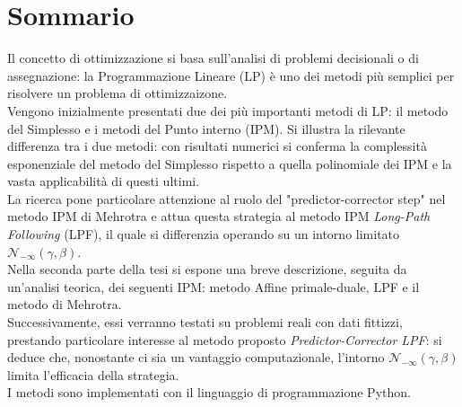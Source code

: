 \documentclass[a4paper,10 pt,titlepage,twoside]{book}
\theoremstyle{plain}
\theoremstyle{definition}
\theoremstyle{remark}
\begin{document}
\chapter*{Sommario}
Il concetto di ottimizzazione si basa sull'analisi di problemi decisionali o di assegnazione: la Programmazione Lineare (LP) è uno dei metodi più semplici per risolvere un problema di ottimizzaizone.\\ 
Vengono inizialmente presentati due dei più importanti metodi di LP: il metodo del Simplesso e i metodi del Punto interno (IPM). Si illustra la rilevante differenza tra i due metodi: con risultati numerici si conferma la complessità esponenziale del metodo del Simplesso rispetto a quella polinomiale dei IPM e la vasta applicabilità di questi ultimi.\\
La ricerca pone particolare attenzione al ruolo del "predictor-corrector step" nel metodo IPM di Mehrotra e attua questa strategia al metodo IPM \textit{Long-Path Following} (LPF), il quale si differenzia operando su un intorno limitato $\mathcal{N}_{-\infty}(\gamma,\beta)$.\\
Nella seconda parte della tesi si espone una breve descrizione, seguita da un'analisi teorica, dei seguenti IPM: metodo Affine primale-duale, LPF e il metodo di Mehrotra.\\
Successivamente, essi verranno testati su problemi reali con dati fittizzi, prestando particolare interesse al metodo proposto \textit{Predictor-Corrector LPF}: si deduce che, nonostante ci sia un vantaggio computazionale, l'intorno $\mathcal{N}_{-\infty}(\gamma,\beta)$ limita l'efficacia della strategia.\\   
I metodi sono implementati con il linguaggio di programmazione Python. 
\end{document}
